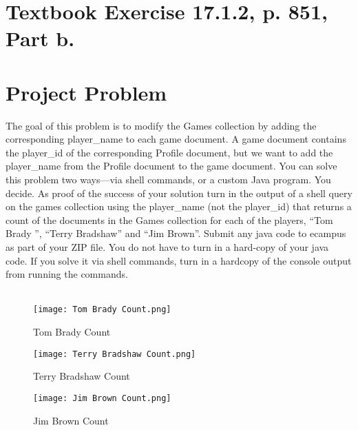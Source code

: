 \documentclass [letter,12pt] {article}
\begin{document}
\section{Textbook Exercise 17.1.2, p. 851, Part b.}

\section{Project Problem}
    The goal of this problem is to modify the Games collection by adding
    the corresponding player\_name to each game document. A game document
    contains the player\_id of the corresponding Profile document, but we
    want to add the player\_name from the Profile document to the game
    document. You can solve this problem two ways—via shell commands, or 
    a custom Java program. You decide. As proof of the success of your 
    solution turn in the output of a shell query on the games collection 
    using the player\_name (not the player\_id) that returns a count of the 
    documents in the Games collection for each of the players, “Tom Brady ”, 
    “Terry Bradshaw” and “Jim Brown”. Submit any java code to ecampus as 
    part of your ZIP file. You do not have to turn in a hard-copy of your 
    java code. If you solve it via shell commands, turn in a hardcopy of 
    the console output from running the commands.
    \\
    \\
    \begin{figure}[htp]
    \centering
    \texttt{[image: Tom Brady Count.png]}
    \caption{Tom Brady Count}
    \label{fig:bradycount}
    \end{figure}
    
    \begin{figure}[htp]
    \centering
    \texttt{[image: Terry Bradshaw Count.png]}
    \caption{Terry Bradshaw Count}
    \label{fig:bradshawcount}
    \end{figure}
    
    \begin{figure}[htp]
    \centering
    \texttt{[image: Jim Brown Count.png]}
    \caption{Jim Brown Count}
    \label{fig:jimcount}
    \end{figure}
\end{document}

